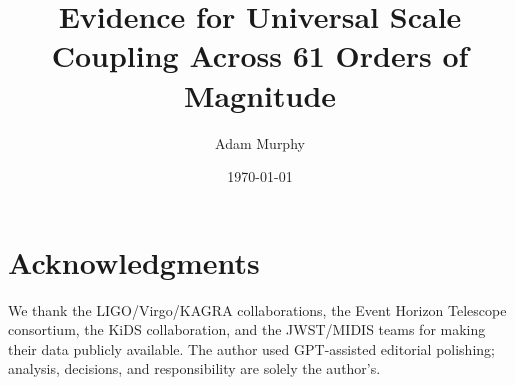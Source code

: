 \documentclass[aps,prd,preprint,onecolumn,nofootinbib,superscriptaddress,longbibliography]{revtex4-2}
\begin{document}
\title{Evidence for Universal Scale Coupling Across 61 Orders of Magnitude}

\author{Adam Murphy}

\date{\today}

\begin{abstract}
\end{abstract}


\maketitle


\section*{Acknowledgments}
We thank the LIGO/Virgo/KAGRA collaborations, the Event Horizon Telescope consortium, the KiDS collaboration, and the JWST/MIDIS teams for making their data publicly available. The author used GPT-assisted editorial polishing; analysis, decisions, and responsibility are solely the author's.



\end{document}
